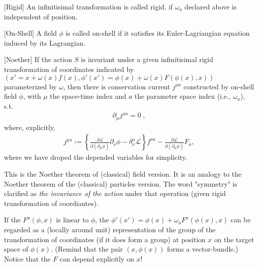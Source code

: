 \documentclass[]{article}
\begin{document}
\begin{definition}{[Rigid]}
  An infinitisimal transformation is called rigid, if $\omega_a$ declared above is independent of position.
\end{definition}

\begin{definition}{[On-Shell]}
A field $\phi$ is called on-shell if it satisfies its Euler-Lagriangian equation induced by its Lagrangian.
\end{definition}

\begin{theorem}{[Noether]}
  If the action $S$ is invariant under a given infinitisimal rigid transformation of coordinates indicated by $\left( x' = x + \omega(x) f(x), \phi'(x') = \phi(x) + \omega(x) F(\phi(x),x) \right)$ parameterized by $\omega$, then there is conservation current $j^{\mu a}$ constructed by on-shell field $\phi$, with $\mu$ the space-time index and $a$ the parameter space index (i.e., $\omega_a$), s.t.
  \begin{align}
    \partial_{\mu} j^{\mu a} = 0
    \;,
  \end{align}
  where, explicitly,
  \begin{align}
    j^{\mu a} :=
    \left\{ \frac{\partial \mathscr{L}}{\partial (\partial_{\mu} \phi)} \partial_{\nu} \phi
      - \delta^{\mu}_{\nu} \mathscr{L}
      \right\} f^{\nu a}
    - \frac{\partial \mathscr{L}}{\partial (\partial_{\mu} \phi)} F_a
    ,
  \end{align}
  where we have droped the depended variables for simplicity. 
\end{theorem}
This is the Noether theorem of (classical) field version. It is an analogy to the Noether theorem of the (classical) particles version. The word "symmetry" is clarified as {\it the invariance of the action} under that operation (given rigid transformation of coordiantes).


\begin{remark}
  If the $F^a(\phi, x)$ is linear to $\phi$, the $\phi'(x') = \phi(x) + \omega_a F^a \left( \phi(x), x \right)$ can be regarded as a (locally around unit) representation of the group of the transformation of coordinates (if it does form a group) at position $x$ on the target space of $\phi(x)$. (Remind that the pair
  $\left( x, \phi(x) \right)$
  forms a vector-bundle.)
  Notice that the $F$ can depend explicitly on $x$!
\end{remark}
\end{document}
